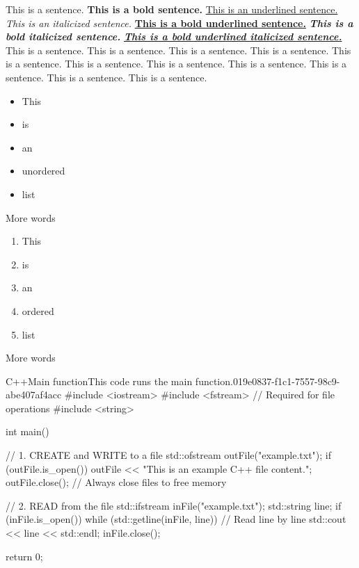 \underline{}


This is a sentence. \textbf{This is a bold sentence.} \underline{This is an underlined sentence.} \textit{This is an italicized sentence.} \underline{\textbf{This is a bold underlined sentence.}}\textbf{ }\textit{\textbf{This is a bold italicized sentence.}} \underline{\textit{\textbf{This is a bold underlined italicized sentence.}}} This is a sentence. This is a sentence. This is a sentence. This is a sentence. This is a sentence. This is a sentence. This is a sentence. This is a sentence. This is a sentence. This is a sentence. This is a sentence.

\begin{itemize}
  \item This
  \item is
  \item an
  \item unordered
  \item list
\end{itemize}

More words

\begin{enumerate}
  \item This
  \item is
  \item an
  \item ordered
  \item list
\end{enumerate}

More words

\begin{notebookcodeblock}{C++}{Main function}{This code runs the main function.}{019e0837-f1c1-7557-98c9-abe407af4acc}
#include <iostream>
#include <fstream> // Required for file operations
#include <string>

int main() {
    // 1. CREATE and WRITE to a file
    std::ofstream outFile("example.txt"); 
    if (outFile.is_open()) {
        outFile << "This is an example C++ file content.\n";
        outFile.close(); // Always close files to free memory
    }

    // 2. READ from the file
    std::ifstream inFile("example.txt");
    std::string line;
    if (inFile.is_open()) {
        while (std::getline(inFile, line)) { // Read line by line
            std::cout << line << std::endl;
        }
        inFile.close();
    }

    return 0;
}
\end{notebookcodeblock}

